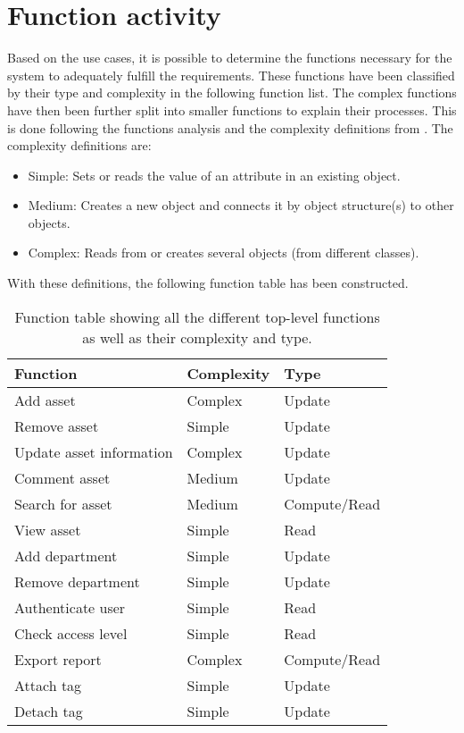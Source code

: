\section{Function activity}\label{sc:function}
Based on the use cases, it is possible to determine the functions necessary for the system to adequately fulfill the requirements. These functions have been classified by their type and complexity in the following function list. The complex functions have then been further split into smaller functions to explain their processes. This is done following the functions analysis and the complexity definitions from \cite[chap 7]{OOAD}. The complexity definitions are:
\begin{itemize}
    \item Simple: Sets or reads the value of an attribute in an existing object.
    \item Medium: Creates a new object and connects it by object structure(s) to other objects.
    \item Complex: Reads from or creates several objects (from different classes).
\end{itemize}
With these definitions, the following function table has been constructed.

\begin{table}[H]
\centering
    \begin{tabular}{|l|l|l|}
        \hline
        \textbf{Function} & \textbf{Complexity} & \textbf{Type} \\
        \hline
        \hline
        Add asset & Complex & Update\\
        \hline
        Remove asset & Simple & Update\\
        \hline
        Update asset information & Complex & Update\\
        \hline
        Comment asset & Medium & Update\\
        \hline
        Search for asset & Medium & Compute/Read\\
        \hline
        View asset & Simple & Read\\
        \hline
        Add department & Simple & Update\\
        \hline
        Remove department & Simple & Update\\
        \hline
        Authenticate user & Simple & Read\\
        \hline
        Check access level & Simple & Read\\
        \hline
        Export report & Complex & Compute/Read\\
        \hline
        Attach tag & Simple & Update\\
        \hline
        Detach tag & Simple & Update\\
        \hline
    \end{tabular}
\caption{Function table showing all the different top-level functions as well as their complexity and type.}\label{tab:functions}
\end{table}


